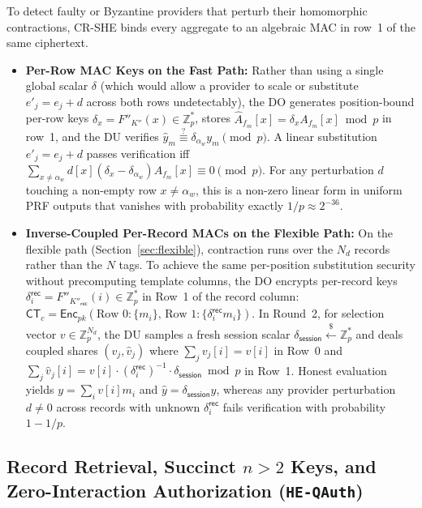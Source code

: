 \documentclass[11pt,a4paper]{article}
\begin{document}
To detect faulty or Byzantine providers that perturb their homomorphic contractions, CR-SHE binds every aggregate to an algebraic MAC in row~1 of the same ciphertext.
\begin{itemize}\setlength{\itemsep}{3pt}\setlength{\parskip}{0pt}
    \item \textbf{Per-Row MAC Keys on the Fast Path:} Rather than using a single global scalar $\delta$ (which would allow a provider to scale or substitute $e'_j = e_j + d$ across both rows undetectably), the DO generates position-bound per-row keys $\delta_x = F''_{K''}(x) \in \mathbb{Z}_p^*$, stores $\widehat{A}_{f_m}[x] = \delta_x A_{f_m}[x] \bmod p$ in row~1, and the DU verifies $\hat{y}_m \stackrel{?}{\equiv} \delta_{\alpha_w} y_m \pmod p$. A linear substitution $e'_j = e_j + d$ passes verification iff $\sum_{x \neq \alpha_w} d[x](\delta_x - \delta_{\alpha_w})A_{f_m}[x] \equiv 0 \pmod p$. For any perturbation $d$ touching a non-empty row $x \neq \alpha_w$, this is a non-zero linear form in uniform PRF outputs that vanishes with probability exactly $1/p \approx 2^{-36}$.
    \item \textbf{Inverse-Coupled Per-Record MACs on the Flexible Path:} On the flexible path (Section~\ref{sec:flexible}), contraction runs over the $N_d$ records rather than the $N$ tags. To achieve the same per-position substitution security without precomputing template columns, the DO encrypts per-record keys $\delta_i^{\mathsf{rec}} = F''_{K''_{\mathsf{rec}}}(i) \in \mathbb{Z}_p^*$ in Row~1 of the record column: $\mathsf{CT}_c = \mathsf{Enc}_{pk}(\text{Row } 0: \{m_i\},\, \text{Row } 1: \{\delta_i^{\mathsf{rec}} m_i\})$. In Round~2, for selection vector $v \in \mathbb{Z}_p^{N_d}$, the DU samples a fresh session scalar $\delta_{\mathsf{session}} \xleftarrow{\$} \mathbb{Z}_p^*$ and deals coupled shares $(v_j, \hat{v}_j)$ where $\sum_j v_j[i] = v[i]$ in Row~0 and $\sum_j \hat{v}_j[i] = v[i] \cdot (\delta_i^{\mathsf{rec}})^{-1} \cdot \delta_{\mathsf{session}} \bmod p$ in Row~1. Honest evaluation yields $y = \sum_i v[i]m_i$ and $\hat{y} = \delta_{\mathsf{session}} y$, whereas any provider perturbation $d \neq 0$ across records with unknown $\delta_i^{\mathsf{rec}}$ fails verification with probability $1 - 1/p$.
\end{itemize}

\subsection{Record Retrieval, Succinct $n > 2$ Keys, and Zero-Interaction Authorization (\texttt{HE-QAuth})}\label{sec:retrieval_auth}
\end{document}
